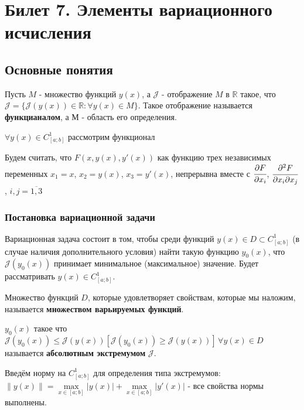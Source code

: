 
\section{Билет 7. Элементы вариационного исчисления}
\subsection{Основные понятия}
\begin{definition}
    Пусть $M$ - множество функций $y(x)$, а $\mathcal{J}$ - отображение $M$ в $\mathbb{R}$ такое, что $\mathcal{J} = \{ \mathcal{J}(y(x)) \in \mathbb{R}: \forall y(x) \in M \}$. 
    Такое отображение называется \textbf{функцианалом}, а $М$ - область его определения. 
\end{definition}

$\forall y(x) \in C^1_{[a;b]}$ рассмотрим функционал 

Будем считать, что $F(x, y(x), y'(x))$ как функцию трех независимых переменных $x_1 = x$, $x_2 = y(x)$, $x_3 = y'(x)$, непрерывна вместе с $\cfrac{\partial{F}}{\partial{x_i}}$,  $\cfrac{\partial^2{F}}{\partial{x_i}\partial{x_j}}$, $i,j = \overline{1, 3}$ 

\subsubsection*{Постановка вариационной задачи}

Вариационная задача состоит в том, чтобы среди функций $y(x) \in D \subset C^1_{[a;b]}$ (в случае наличия дополнительного условия) найти такую функцию $y_0(x)$, что $\mathcal{J}(y_0(x))$ принимает минимальное (максимальное) значение. Будет рассматривать $y(x) \in C^1_{[a;b]}$.

\begin{definition}
    Множество функций $D$, которые удовлетворяет свойствам, которые мы наложим, называется \textbf{множеством варьируемых функций}.
\end{definition}

\begin{definition}
    $y_0(x)$ такое что $\mathcal{J}(y_0(x)) \leq \mathcal{J}(y(x)) [\mathcal{J}(y_0(x)) \geq \mathcal{J}(y(x))] \, \forall y(x) \in D$ называется \textbf{абсолютным экстремумом} $\mathcal{J}$.  
\end{definition}

Введём норму на $C^1_{[a;b]}$ для определения типа экстремумов: $\| y(x) \| = \max \limits_{x \in [a;b]} |y(x)| + \max \limits_{x \in [a;b]} |y'(x)|$ - все свойства нормы выполнены.

